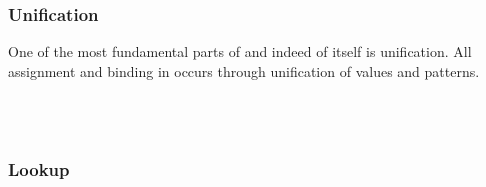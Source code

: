 \subsubsection{Unification}

One of the most fundamental parts of \Law{} and indeed of \Trilogy{} itself
is unification. All assignment and binding in \Trilogy{} occurs through
unification of values and patterns.

\begin{bnf*}
     \\
     \\
\end{bnf*}

\subsubsection{Lookup}
